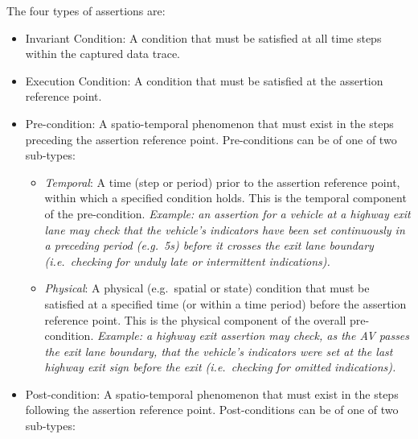 The four types of assertions are:
\begin{itemize}
    \item Invariant Condition:
A condition that must be satisfied at all time steps within the captured data trace.
     \item Execution Condition:
A condition that must be satisfied at the assertion reference point.
    \item Pre-condition: %
    A spatio-temporal phenomenon that must exist in the steps preceding the assertion reference point. Pre-conditions can be of one of two sub-types:
    \begin{itemize}
        \item \textit{Temporal}: A time (step or period) prior to the assertion reference point, within which a specified condition holds. This is the temporal component of the pre-condition. %
        \textit{Example: an assertion for a vehicle at a highway exit lane may check that the vehicle's indicators have been set continuously in a preceding period (e.g.\ 5s) before it crosses the exit lane boundary (i.e.\ checking for unduly late or intermittent indications).}
        \item \textit{Physical}: A physical (e.g.\ spatial or state) condition that must be satisfied at a specified time (or within a  time period) before the assertion reference point. This is the physical component of the overall pre-condition. %
        \textit{Example: a highway exit assertion may check, as the AV passes the exit lane boundary, that the vehicle's indicators were set at the last highway exit sign before the exit (i.e.\ checking for omitted indications).}
    \end{itemize}
    \item Post-condition: %
    A spatio-temporal phenomenon that must exist in the steps following the assertion reference point. Post-conditions can be of one of two sub-types:

\end{itemize}
